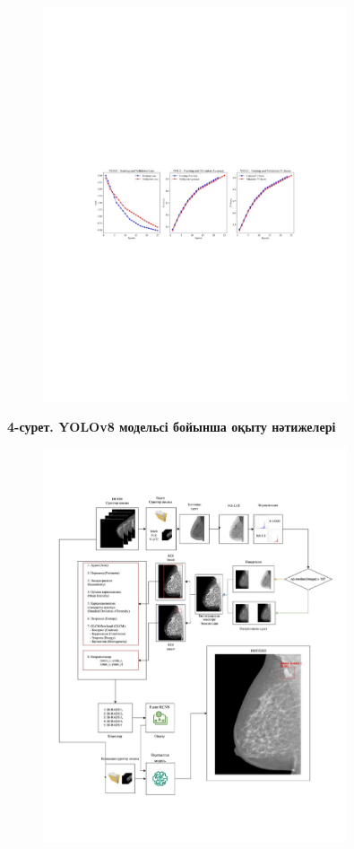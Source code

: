 \begin{figure}[H]
	\centering
	\includegraphics[width=0.8\textwidth]{media/ict/image26}
	\caption*{}
\end{figure}


{\bfseries 4-сурет. YOLOv8 модельсі бойынша оқыту нәтижелері}

\begin{figure}[H]
	\centering
	\includegraphics[width=0.8\textwidth]{media/ict/image27}
	\caption*{}
\end{figure}


